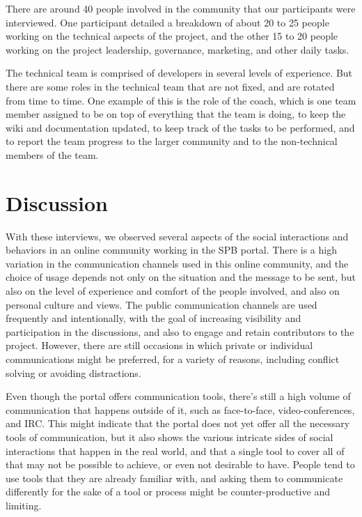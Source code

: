 \documentclass{sigchi}
\begin{document}
There are around 40 people involved in the community that our participants were interviewed. One participant detailed a breakdown of about 20 to 25 people working on the technical aspects of the project, and the other 15 to 20 people working on the project leadership, governance, marketing, and other daily tasks.

The technical team is comprised of developers in several levels of experience. But there are some roles in the technical team that are not fixed, and are rotated from time to time. One example of this is the role of the coach, which is one team member assigned to be on top of everything that the team is doing, to keep the wiki and documentation updated, to keep track of the tasks to be performed, and to report the team progress to the larger community and to the non-technical members of the team.

\section{Discussion}

With these interviews, we observed several aspects of the social interactions and behaviors in an online community working in the SPB portal. There is a high variation in the communication channels used in this online community, and the choice of usage depends not only on the situation and the message to be sent, but also on the level of experience and comfort of the people involved, and also on personal culture and views. The public communication channels are used frequently and  intentionally, with the goal of increasing visibility and participation in the discussions, and also to engage and retain contributors to the project. However, there are still occasions in which private or individual communications might be preferred, for a variety of reasons, including conflict solving or avoiding distractions.

Even though the portal offers communication tools, there's still a high volume of communication that happens outside of it, such as face-to-face, video-conferences, and IRC. This might indicate that the portal does not yet offer all the necessary tools of communication, but it also shows the various intricate sides of social interactions that happen in the real world, and that a single tool to cover all of that may not be possible to achieve, or even not desirable to have. People tend to use tools that they are already familiar with, and asking them to communicate differently for the sake of a tool or process might be counter-productive and limiting.
\end{document}
